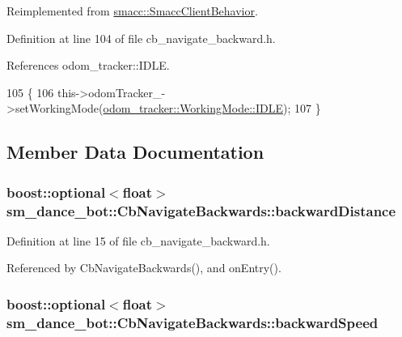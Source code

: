 Reimplemented from \hyperlink{classsmacc_1_1SmaccClientBehavior_ac0cd72d42bd00425362a97c9803ecce5}{smacc\+::\+Smacc\+Client\+Behavior}.



Definition at line 104 of file cb\+\_\+navigate\+\_\+backward.\+h.



References odom\+\_\+tracker\+::\+I\+D\+LE.


\begin{DoxyCode}
105     \{
106         this->odomTracker\_->setWorkingMode(\hyperlink{namespaceodom__tracker_a4daf27fd157b1a481fdfd6f90de00b88aa5daf7f2ebbba4975d61dab1c40188c7}{odom\_tracker::WorkingMode::IDLE});
107     \}
\end{DoxyCode}


\subsection{Member Data Documentation}
\subsubsection[{\texorpdfstring{backward\+Distance}{backwardDistance}}]{\setlength{\rightskip}{0pt plus 5cm}boost\+::optional$<$float$>$ sm\+\_\+dance\+\_\+bot\+::\+Cb\+Navigate\+Backwards\+::backward\+Distance}\hypertarget{classsm__dance__bot_1_1CbNavigateBackwards_ad5b1a7d85676aefa31f966baf61b6378}{}\label{classsm__dance__bot_1_1CbNavigateBackwards_ad5b1a7d85676aefa31f966baf61b6378}


Definition at line 15 of file cb\+\_\+navigate\+\_\+backward.\+h.



Referenced by Cb\+Navigate\+Backwards(), and on\+Entry().

\subsubsection[{\texorpdfstring{backward\+Speed}{backwardSpeed}}]{\setlength{\rightskip}{0pt plus 5cm}boost\+::optional$<$float$>$ sm\+\_\+dance\+\_\+bot\+::\+Cb\+Navigate\+Backwards\+::backward\+Speed}\hypertarget{classsm__dance__bot_1_1CbNavigateBackwards_ac61b513376e38ae6eb3eb9c9ebf1dd8e}{}\label{classsm__dance__bot_1_1CbNavigateBackwards_ac61b513376e38ae6eb3eb9c9ebf1dd8e}


